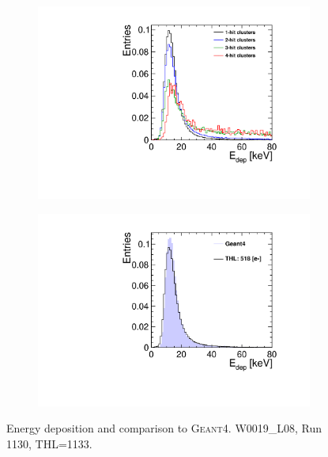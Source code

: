 \begin{figure}[htbp] \centering
  \begin{subfigure}[b]{0.45\textwidth}
    \includegraphics[width=\textwidth]{./figures/Calibration/Edep_Clusters_W0019_L08.pdf}
    \caption{}
  \end{subfigure}\hfill
  \begin{subfigure}[b]{0.45\textwidth}
    \includegraphics[width=\textwidth]{./figures/Calibration/Edep_G4_W0019_L08.pdf}
    \caption{}
  \end{subfigure}
  \caption{Energy deposition and comparison to
    \textsc{Geant4}. W0019\_L08, Run 1130, THL=1133.}
  \label{fig:EdepW19L8}
\end{figure}


